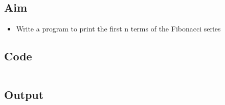 \documentclass[../main.tex]{subfiles}
\begin{document}
\subsection{Aim}
\begin{itemize}
	\item Write a program to print the first n terms of the Fibonacci series
\end{itemize}

\subsection{Code}
\inputminted[frame=lines, breaklines, breakanywhere, numberblanklines=false]{java}{./programs/prog1/Fibo.java}

\subsection{Output}
\end{document}
